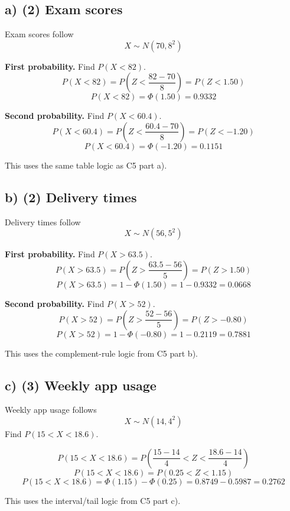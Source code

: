 \subsection*{a) (2) Exam scores}
\label{subsec:contextual-normal-distribution-problems-c6-a}
Exam scores follow
\[
X\sim N(70,8^2)
\]

\textbf{First probability.} Find \(P(X<82)\).
\[
P(X<82)=P\left(Z<\frac{82-70}{8}\right)
=P(Z<1.50)
\]
\[
P(X<82)=\Phi(1.50)=0.9332
\]

\textbf{Second probability.} Find \(P(X<60.4)\).
\[
P(X<60.4)=P\left(Z<\frac{60.4-70}{8}\right)
=P(Z<-1.20)
\]
\[
P(X<60.4)=\Phi(-1.20)=0.1151
\]

This uses the same table logic as C5 part a).


\subsection*{b) (2) Delivery times}
\label{subsec:contextual-normal-distribution-problems-c6-b}
Delivery times follow
\[
X\sim N(56,5^2)
\]

\textbf{First probability.} Find \(P(X>63.5)\).
\[
P(X>63.5)=P\left(Z>\frac{63.5-56}{5}\right)
=P(Z>1.50)
\]
\[
P(X>63.5)=1-\Phi(1.50)=1-0.9332=0.0668
\]

\textbf{Second probability.} Find \(P(X>52)\).
\[
P(X>52)=P\left(Z>\frac{52-56}{5}\right)
=P(Z>-0.80)
\]
\[
P(X>52)=1-\Phi(-0.80)=1-0.2119=0.7881
\]

This uses the complement-rule logic from C5 part b).


\subsection*{c) (3) Weekly app usage}
\label{subsec:contextual-normal-distribution-problems-c6-c}
Weekly app usage follows
\[
X\sim N(14,4^2)
\]
Find \(P(15<X<18.6)\).

\[
P(15<X<18.6)
=
P\left(\frac{15-14}{4}<Z<\frac{18.6-14}{4}\right)
\]
\[
P(15<X<18.6)=P(0.25<Z<1.15)
\]
\[
P(15<X<18.6)=\Phi(1.15)-\Phi(0.25)
=0.8749-0.5987
=0.2762
\]

This uses the interval/tail logic from C5 part c).


